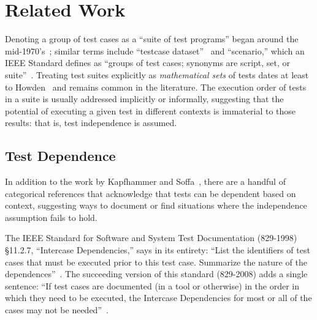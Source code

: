 \section{Related Work}
\label{sec:related}


Denoting a group of test cases as a ``suite of test programs'' began around the
mid-1970's~\cite[p.~217]{brown:CSUR:1974}; similar terms include
``testcase dataset''~\cite{milleretal:ICRS:1975} and ``scenario,''
which an IEEE Standard defines as ``groups of test cases;
synonyms are script, set, or suite''~\cite[p.~10]{IEEE:829-1998}.
Treating test suites explicitly as \emph{mathematical sets} of tests dates at least
to Howden~\cite[p.~554]{howden:ToC:1975} and remains common in the literature.
The execution order of tests in a suite is usually addressed implicitly
or informally, suggesting that the potential of executing a given test
in different contexts is immaterial to those results: that is, test
independence is assumed. 




\subsection{Test Dependence}

In addition to the work by Kapfhammer and
Soffa~\cite{kapfhammeretal:FSE:2003},
there are a handful of categorical references that
acknowledge that tests can
be dependent based on context, suggesting 
ways to document or find situations where the independence
assumption fails to hold.  

The IEEE Standard for Software and System Test
Documentation (829-1998) \S 11.2.7, ``Intercase
Dependencies,'' says in its entirety: ``List the identifiers of
test cases that must be executed prior to this test
case. Summarize
the nature of the dependences''~\cite{IEEE:829-1998}.  The succeeding version of this
standard (829-2008) adds a single sentence: ``If
test cases are documented (in a tool or otherwise) in the order in
which they need to be executed, the Intercase Dependencies for most or
all of the cases may not be needed''~\cite{IEEE:829-2008}.

